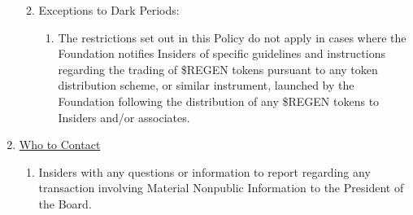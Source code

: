 \documentclass[10pt]{article}
\begin{document}
\begin{enumerate}
\begin{enumerate}
\begin{enumerate}
		\end{enumerate}
	\item Exceptions to Dark Periods:
		\begin{enumerate}
		\item The restrictions set out in this Policy do not apply in cases where the Foundation notifies Insiders of specific guidelines and instructions regarding the trading of \$REGEN tokens pursuant to any token distribution scheme, or similar instrument, launched by the Foundation following the distribution of any \$REGEN tokens to Insiders and/or associates.
		\end{enumerate}
	\end{enumerate}
\item \underline{Who to Contact}
	\begin{enumerate}
	\item Insiders with any questions or information to report regarding any transaction involving Material Nonpublic Information to the President of the Board.
	\end{enumerate}
\end{enumerate}
\end{document}
